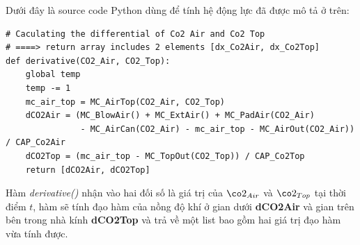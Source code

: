 \documentclass[13pt,a4paper]{article}
\begin{document}
			Dưới đây là source code Python dùng để tính hệ động lực đã được mô tả ở trên:
			
\begin{lstlisting}
# Caculating the differential of Co2 Air and Co2 Top
# ====> return array includes 2 elements [dx_Co2Air, dx_Co2Top]
def derivative(CO2_Air, CO2_Top):
	global temp
	temp -= 1
	mc_air_top = MC_AirTop(CO2_Air, CO2_Top)
	dCO2Air = (MC_BlowAir() + MC_ExtAir() + MC_PadAir(CO2_Air)
			   - MC_AirCan(CO2_Air) - mc_air_top - MC_AirOut(CO2_Air)) / CAP_Co2Air
	dCO2Top = (mc_air_top - MC_TopOut(CO2_Top)) / CAP_Co2Top
	return [dCO2Air, dCO2Top]
\end{lstlisting}
			Hàm \textit{derivative()} nhận vào hai đối số là giá trị của $\co2_{Air}$ và $\co2_{Top}$ tại thời điểm $t$, hàm sẽ tính đạo hàm của nồng độ khí  ở gian dưới \textbf{dCO2Air} và gian trên bên trong nhà kính \textbf{dCO2Top} và trả về một list bao gồm hai giá trị đạo hàm vừa tính được.
			
\end{document}
